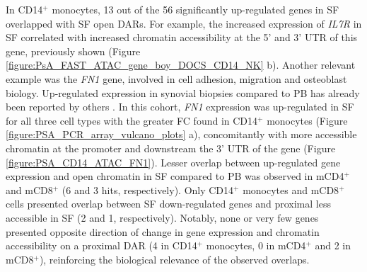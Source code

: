 In CD14$^+$ monocytes, 13 out of the 56 significantly up-regulated genes in SF overlapped with SF open DARs. For example, the increased expression of \textit{IL7R} in SF correlated with increased chromatin accessibility at the 5' and 3' UTR of this gene, previously shown (Figure \ref{figure:PsA_FAST_ATAC_gene_boy_DOCS_CD14_NK} b). Another relevant example was the \textit{FN1} gene, involved in cell adhesion, migration and osteoblast biology. Up-regulated expression in synovial biopsies compared to PB has already been reported by others \parencite{Dolcino2015}. In this cohort, \textit{FN1} expression was up-regulated in SF for all three cell types with the greater FC found in CD14$^+$ monocytes (Figure \ref{figure:PSA_PCR_array_vulcano_plots} a), concomitantly with more accessible chromatin at the promoter and downstream the 3' UTR of the gene (Figure \ref{figure:PSA_CD14_ATAC_FN1}). Lesser overlap between up-regulated gene expression and open chromatin in SF compared to PB was observed in mCD4$^+$ and mCD8$^+$ (6 and 3 hits, respectively). Only CD14$^+$ monocytes and mCD8$^+$ cells presented overlap between SF down-regulated genes and proximal less accessible in SF (2 and 1, respectively). Notably, none or very few genes presented opposite direction of change in gene expression and chromatin accessibility on a proximal DAR (4 in CD14$^+$ monocytes, 0 in mCD4$^+$ and 2 in mCD8$^+$), reinforcing the biological relevance of the observed overlaps. 
	

